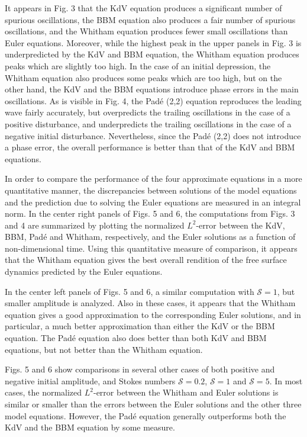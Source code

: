It appears in Fig. 3 
that the KdV equation produces a significant number of spurious oscillations,
the BBM equation also produces a fair number of spurious oscillations, and
the Whitham equation produces fewer small oscillations than Euler equations.
Moreover, while the highest peak in the upper panels in Fig. 3 is
underpredicted by the KdV and BBM equation, the Whitham equation
produces peaks which are slightly too high.
In the case of an initial depression, the Whitham equation also
produces some peaks which are too high, but on the other hand,
the KdV and the BBM equations introduce phase errors in the
main oscillations. 
As is visible in Fig. 4,
the Pad\'e (2,2) equation reproduces the leading wave fairly accurately,
but overpredicts the trailing oscillations in the case of a positive disturbance,
and underpredicts the trailing oscillations in the case of a negative initial disturbance.
Nevertheless, since the Pad\'e (2,2) does not introduce a phase error, the overall performance
is better than that of the KdV and BBM equations.

In order to compare the performance of the four approximate equations
in a more quantitative manner, the discrepancies between solutions of the model equations
and the prediction due to solving the Euler equations are measured in an integral norm.
In the center right panels of Figs. 5 and 6, 
the computations from Figs. 3 and 4 are
summarized by plotting the normalized $L^2$-error between the KdV, BBM, Pad\'e and Whitham,
respectively, and the Euler solutions as a function of non-dimensional time.
Using this quantitative measure of comparison, it appears that the Whitham
equation gives the best overall rendition of the free surface dynamics
predicted by the Euler equations.

In the center left panels of Figs. 5 and 6, 
a similar computation with $\mathcal{S} = 1$, but smaller amplitude is analyzed. 
Also in these cases, it appears that the Whitham
equation gives a good approximation to the corresponding Euler solutions, and in
particular, a much better approximation than either the KdV or the BBM equation.
The Pad\'e equation also does better than both KdV and BBM equations, but not better
than the Whitham equation.

Figs. 5 and 6 show comparisons in several other cases of both positive
and negative initial amplitude, 
and Stokes numbers $\mathcal{S} = 0.2$, $\mathcal{S} = 1$ and $\mathcal{S} = 5$.
In most cases, the normalized $L^2$-error between the Whitham and Euler solutions is similar
or smaller than the errors between the Euler solutions and the other three model equations.
However, the Pad\'e equation generally outperforms both the KdV and the BBM equation by some measure.

